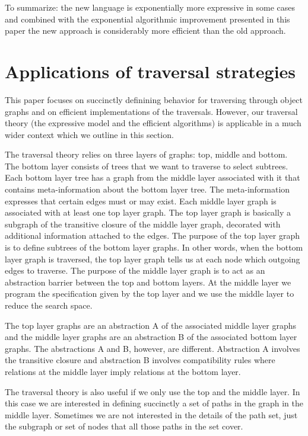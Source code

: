 To summarize: the new language is exponentially more expressive in
some cases and combined with the exponential algorithmic improvement
presented in this paper the new approach is considerably more
efficient than the old approach.

\section{Applications of traversal strategies}
\label{sec-appls-trav-strats}

This paper focuses on succinctly definining behavior for traversing
through object graphs and on efficient implementations of the
traversals. However, our traversal theory (the expressive model and
the efficient algorithms) is applicable in a much wider context which
we outline in this section.

The traversal theory relies on three layers of graphs: top, middle and
bottom. The bottom layer consists of trees that we want to traverse to
select subtrees. Each bottom layer tree has a graph from the middle
layer associated with it that contains meta-information about the
bottom layer tree. The meta-information expresses that certain edges
must or may exist. Each middle layer graph is associated with at least
one top layer graph. The top layer graph is basically a subgraph of
the transitive closure of the middle layer graph, decorated with
additional information attached to the edges. The purpose of the top
layer graph is to define subtrees of the bottom layer graphs. In
other words, when the bottom layer graph is traversed, the top layer
graph tells us at each node which outgoing edges to traverse.  The
purpose of the middle layer graph is to act as an abstraction barrier
between the top and bottom layers. At the middle layer we program the
specification given by the top layer and we use the middle layer to
reduce the search space.

The top layer graphs are an abstraction A of the associated middle
layer graphs and the middle layer graphs are an abstraction B of the
associated bottom layer graphs. The abstractions A and B, however, are
different. Abstraction A involves the transitive closure and
abstraction B involves compatibility rules where relations at the
middle layer imply relations at the bottom layer.

The traversal theory is also useful if we only use the top and the
middle layer. In this case we are interested in defining succinctly a
set of paths in the graph in the middle layer. Sometimes we are not
interested in the details of the path set, just the subgraph or set of
nodes that all those paths in the set cover.

